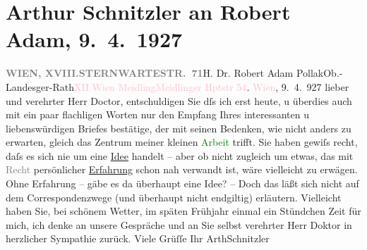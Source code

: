 

               \section[Arthur Schnitzler an Robert Adam, 9. 4. 1927]{ Arthur Schnitzler an Robert Adam, 9. 4. 1927}\nopagebreak{}\rehead{ }\normalsize\beginnumbering{} \toendnotes[C]{\smallbreak\pagebreak[2]} 
\toendnotes[C]{\smallbreak}\pstart{}{\pb}\label{T_L02484-1v}\label{T_L02484-1h}\pend{}\pstart{}\textcolor{pink}{\textcolor{gray}{\textbf{WIEN, XVIII.}}}{}\ledrightnote{\textcolor{pink}{XVIII., Währing}}\pend{}\pstart{}\textcolor{pink}{\textcolor{gray}{\textbf{STERNWARTESTR. 71}}}{}\ledrightnote{\textcolor{pink}{Sternwartestraße}}\pend{}{\bigskip}\pstart{}H. Dr. Robert Adam Pollak\pend{}\pstart{}Ob.-Landesger-Rath\pend{}\pstart{}\textcolor{pink}{XII Wien Meidling}{}\ledrightnote{\textcolor{pink}{XII., Meidling}}\pend{}\pstart{}\textcolor{pink}{Meidlinger Hptstr 54}{}\ledrightnote{\textcolor{pink}{Meidlinger Hauptstraße}}.\pend{}{\bigskip}\pstart
           \raggedleft{}{\pb}\textcolor{pink}{Wien}{}\ledrightnote{\textcolor{pink}{Wien}}, 9. 4. 927\pend
           \pstart
           lieber und verehrter Herr Doctor, entschuldigen Sie dſs ich
                    erst heute, u überdies auch mit ein paar flachligen Worten nur den Empfang Ihres
                    interessanten u liebenswürdigen Briefes bestätige, der mit seinen Bedenken, wie
                    nicht anders zu erwarten, gleich das Zentrum meiner kleinen \textcolor{green}{Arbeit}{} trifft. Sie haben gewiſs recht,
                    daſs es sich nie um eine \uline{Idee} handelt – aber ob
                    nicht zugleich um etwas, das mit \textcolor{gray}{Recht} persönlicher \uline{Erfahrung} schon nah verwandt ist, wäre
                    vielleicht zu erwägen. Ohne Erfahrung – gäbe es da{\geminationn}
                    überhaupt eine Idee? – Doch das läßt {\pb}sich nicht auf dem
                    Correspondenzwege (und überhaupt nicht endgiltig) erläutern. Vielleicht haben
                    Sie, bei schönem Wetter, im späten Frühjahr einmal ein Stündchen Zeit für mich,
                    ich denke an unsere Gespräche und an Sie selbst verehrter Herr Doktor in
                    herzlicher Sympathie zurück.\pend
           \pstart Viele Grüſſe Ihr \spacefill\mbox{ArthSchnitzler}\pend{}\endnumbering{}  
      